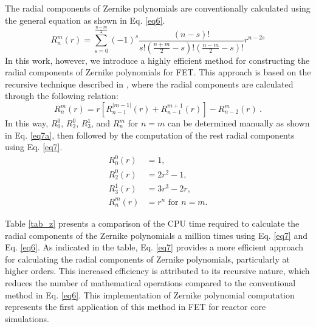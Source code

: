 The radial components of Zernike polynomials are conventionally calculated using the general equation as shown in Eq. \ref{eq6}.
\begin{equation}
R_n^m(r) = \sum_{s=0}^{\frac{n-m}{2}} (-1)^s \frac{(n-s)!}{s! \left( \frac{n+m}{2} - s \right)! \left( \frac{n-m}{2} - s \right)!} r^{n-2s}
\label{eq6}
\end{equation}
In this work, however, we introduce a highly efficient method for constructing the radial components of Zernike polynomials for FET. This approach is based on the recursive technique described in \cite{honarvar}, where the radial components are calculated through the following relation:
\begin{equation}
    R_n^m\left(r\right)=r\left[R_{n-1}^{\left|m-1\right|}\left(r\right)+R_{n-1}^{m+1}\left(r\right)\right]-R_{n-2}^m\left(r\right)\ .
    \label{eq7}
\end{equation}
In this way, $R_0^0$, $R_2^0$, $R_3^1$, and $R_n^m$ for $n=m$ can be determined manually as shown in Eq. \ref{eq7a}, then followed by the computation of the rest radial components using Eq. \ref{eq7}.
\begin{equation}
    \begin{split}
    R_0^0(r) &= 1, \\
    R_2^0(r) &= 2r^2-1, \\
    R_3^1(r) &= 3r^3-2r, \\
    R_n^m(r) &= r^n \text{ for } n = m.
    \end{split}
    \label{eq7a}
\end{equation}

Table \ref{tab_z} presents a comparison of the CPU time required to calculate the radial components of the Zernike polynomials a million times using Eq. \ref{eq7} and Eq. \ref{eq6}. As indicated in the table, Eq. \ref{eq7} provides a more efficient approach for calculating the radial components of Zernike polynomials, particularly at higher orders. This increased efficiency is attributed to its recursive nature, which reduces the number of mathematical operations compared to the conventional method in Eq. \ref{eq6}. This implementation of Zernike polynomial computation represents the first application of this method in FET for reactor core simulations.

